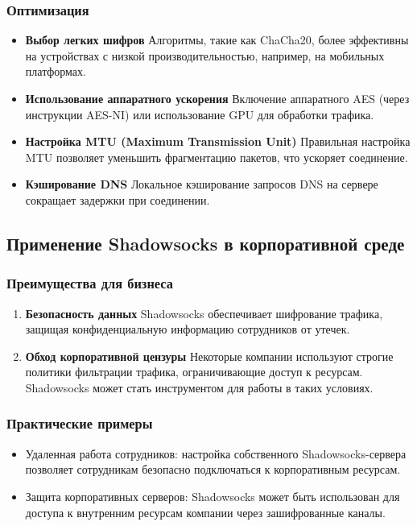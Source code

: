 \documentclass{SCWorks}
\begin{document}
\subsubsection{Оптимизация}
\begin{itemize}
    \item \textbf{Выбор легких шифров}  
    Алгоритмы, такие как ChaCha20, более эффективны на устройствах с низкой производительностью, например, на мобильных платформах.

    \item \textbf{Использование аппаратного ускорения}  
    Включение аппаратного AES (через инструкции AES-NI) или использование GPU для обработки трафика.

    \item \textbf{Настройка MTU (Maximum Transmission Unit)}  
    Правильная настройка MTU позволяет уменьшить фрагментацию пакетов, что ускоряет соединение.

    \item \textbf{Кэширование DNS}  
    Локальное кэширование запросов DNS на сервере сокращает задержки при соединении.
\end{itemize}

\subsection{Применение Shadowsocks в корпоративной среде}

\subsubsection{Преимущества для бизнеса}
\begin{enumerate}
    \item \textbf{Безопасность данных}  
    Shadowsocks обеспечивает шифрование трафика, защищая конфиденциальную информацию сотрудников от утечек.

    \item \textbf{Обход корпоративной цензуры}  
    Некоторые компании используют строгие политики фильтрации трафика, ограничивающие доступ к ресурсам. Shadowsocks может стать инструментом для работы в таких условиях.
\end{enumerate}

\subsubsection{Практические примеры}
\begin{itemize}
    \item Удаленная работа сотрудников: настройка собственного Shadowsocks-сервера позволяет сотрудникам безопасно подключаться к корпоративным ресурсам.
    \item Защита корпоративных серверов: Shadowsocks может быть использован для доступа к внутренним ресурсам компании через зашифрованные каналы.
\end{itemize}
\end{document}
